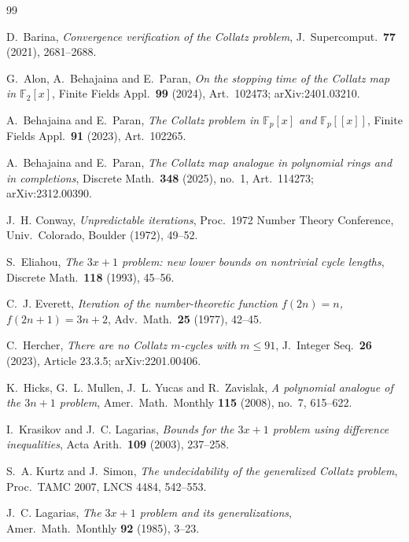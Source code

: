\documentclass[11pt]{amsart}
\theoremstyle{definition}
\theoremstyle{remark}
\newcommand{\F}{\mathbb{F}}
\begin{document}
\begin{thebibliography}{99}
\footnotesize

D.~Barina, \emph{Convergence verification of the Collatz problem},
J.~Supercomput.\ \textbf{77} (2021), 2681--2688.

G.~Alon, A.~Behajaina and E.~Paran, \emph{On the stopping time of the
Collatz map in $\F_2[x]$}, Finite Fields Appl.\ \textbf{99} (2024),
Art.~102473; arXiv:2401.03210.

A.~Behajaina and E.~Paran, \emph{The Collatz problem in $\F_p[x]$ and
$\F_p[[x]]$}, Finite Fields Appl.\ \textbf{91} (2023), Art.~102265.

A.~Behajaina and E.~Paran, \emph{The Collatz map analogue in polynomial
rings and in completions}, Discrete Math.\ \textbf{348} (2025), no.~1,
Art.~114273; arXiv:2312.00390.

J.~H. Conway, \emph{Unpredictable iterations}, Proc.\ 1972 Number Theory
Conference, Univ.\ Colorado, Boulder (1972), 49--52.

S.~Eliahou, \emph{The $3x+1$ problem: new lower bounds on nontrivial cycle
lengths}, Discrete Math.\ \textbf{118} (1993), 45--56.

C.~J. Everett, \emph{Iteration of the number-theoretic function
$f(2n)=n$, $f(2n+1)=3n+2$}, Adv.\ Math.\ \textbf{25} (1977), 42--45.

C.~Hercher, \emph{There are no Collatz $m$-cycles with $m \le 91$},
J.~Integer Seq.\ \textbf{26} (2023), Article 23.3.5; arXiv:2201.00406.

K.~Hicks, G.~L. Mullen, J.~L. Yucas and R.~Zavislak, \emph{A polynomial
analogue of the $3n+1$ problem}, Amer.\ Math.\ Monthly \textbf{115} (2008),
no.~7, 615--622.

I.~Krasikov and J.~C. Lagarias, \emph{Bounds for the $3x+1$ problem using
difference inequalities}, Acta Arith.\ \textbf{109} (2003), 237--258.

S.~A. Kurtz and J.~Simon, \emph{The undecidability of the generalized
Collatz problem}, Proc.\ TAMC 2007, LNCS 4484, 542--553.

J.~C. Lagarias, \emph{The $3x+1$ problem and its generalizations},
Amer.\ Math.\ Monthly \textbf{92} (1985), 3--23.


\end{thebibliography}
\end{document}
